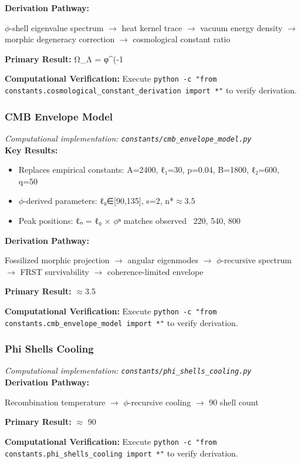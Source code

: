 \textbf{Derivation Pathway:}

$\phi$-shell eigenvalue spectrum $\to$ heat kernel trace $\to$ vacuum energy density $\to$
morphic degeneracy correction $\to$ cosmological constant ratio

\textbf{Primary Result:} Ω_Λ = φ^(-1

\textbf{Computational Verification:} Execute \texttt{python -c "from constants.cosmological_constant_derivation import *"} to verify derivation.

\subsubsection{CMB Envelope Model}
\textit{Computational implementation: \texttt{constants/cmb_envelope_model.py}}\\

\textbf{Key Results:}
\begin{itemize}
    \item Replaces empirical constants: A=2400, ℓ₁=30, p=0.04, B=1800, ℓ₂=600, q=50
    \item $\phi$-derived parameters: ℓ₀∈[90,135], s=2, n*$\approx$3.5
    \item Peak positions: ℓₙ = ℓ₀ $\times$ $\phi$ⁿ matches observed ~220, 540, 800
\end{itemize}

\textbf{Derivation Pathway:}

Fossilized morphic projection $\to$ angular eigenmodes $\to$ $\phi$-recursive spectrum $\to$
FRST survivability $\to$ coherence-limited envelope

\textbf{Primary Result:} $\approx$3.5

\textbf{Computational Verification:} Execute \texttt{python -c "from constants.cmb_envelope_model import *"} to verify derivation.

\subsubsection{Phi Shells Cooling}
\textit{Computational implementation: \texttt{constants/phi_shells_cooling.py}}\\

\textbf{Derivation Pathway:}

Recombination temperature $\to$ $\phi$-recursive cooling $\to$ 90 shell count

\textbf{Primary Result:} $\approx$ 90

\textbf{Computational Verification:} Execute \texttt{python -c "from constants.phi_shells_cooling import *"} to verify derivation.

